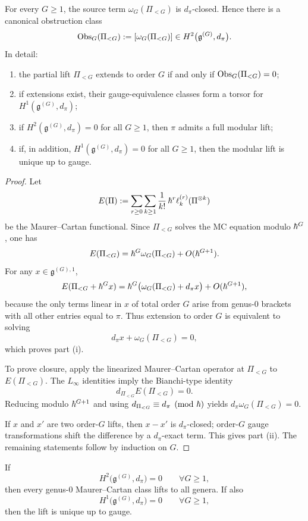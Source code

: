 \begin{theorem}
\label{thm:all-genus-obstruction-tower}
For every $G\ge 1$, the source term $\omega_G(\Pi_{<G})$ is $d_\pi$-closed. Hence there is a
canonical obstruction class
\[
\operatorname{Obs}_G(\Pi_{<G})
:=
[\omega_G(\Pi_{<G})]
\in H^2\bigl(\mathfrak g^{(G)},d_\pi\bigr).
\]
In detail:
\begin{enumerate}[label=\textup{(\roman*)}]
\item the partial lift $\Pi_{<G}$ extends to order $G$ if and only if
$\operatorname{Obs}_G(\Pi_{<G})=0$;
\item if extensions exist, their gauge-equivalence classes form a torsor for
$H^1(\mathfrak g^{(G)},d_\pi)$;
\item if $H^2(\mathfrak g^{(G)},d_\pi)=0$ for all $G\ge 1$, then $\pi$ admits a full modular
lift;
\item if, in addition, $H^1(\mathfrak g^{(G)},d_\pi)=0$ for all $G\ge 1$, then the modular lift
is unique up to gauge.
\end{enumerate}
\end{theorem}

\begin{proof}
Let
\[
E(\Pi):=\sum_{r\ge 0}\sum_{k\ge 1}\frac1{k!}\,\hbar^r\ell_k^{(r)}(\Pi^{\otimes k})
\]
be the Maurer--Cartan functional. Since $\Pi_{<G}$ solves the MC equation modulo $\hbar^G$, one
has
\[
E(\Pi_{<G})=\hbar^G\omega_G(\Pi_{<G})+O(\hbar^{G+1}).
\]
For any $x\in\mathfrak g^{(G),1}$,
\[
E(\Pi_{<G}+\hbar^Gx)=\hbar^G\bigl(\omega_G(\Pi_{<G})+d_\pi x\bigr)+O(\hbar^{G+1}),
\]
because the only terms linear in $x$ of total order $G$ arise from genus-$0$ brackets with all
other entries equal to $\pi$. Thus extension to order $G$ is equivalent to solving
\[
d_\pi x+\omega_G(\Pi_{<G})=0,
\]
which proves part \textup{(i)}.

To prove closure, apply the linearized Maurer--Cartan operator at $\Pi_{<G}$ to
$E(\Pi_{<G})$. The $L_\infty$ identities imply the Bianchi-type identity
\[
d_{\Pi_{<G}}E(\Pi_{<G})=0.
\]
Reducing modulo $\hbar^{G+1}$ and using $d_{\Pi_{<G}}\equiv d_\pi \pmod{\hbar}$ yields
$d_\pi\omega_G(\Pi_{<G})=0$.

If $x$ and $x'$ are two order-$G$ lifts, then $x-x'$ is $d_\pi$-closed; order-$G$ gauge
transformations shift the difference by a $d_\pi$-exact term. This gives part \textup{(ii)}.
The remaining statements follow by induction on $G$.
\end{proof}

\begin{corollary}
\label{cor:existence-uniqueness-vanishing}
If
\[
H^2\bigl(\mathfrak g^{(G)},d_\pi\bigr)=0\qquad \forall G\ge 1,
\]
then every genus-$0$ Maurer--Cartan class lifts to all genera. If also
\[
H^1\bigl(\mathfrak g^{(G)},d_\pi\bigr)=0\qquad \forall G\ge 1,
\]
then the lift is unique up to gauge.
\end{corollary}

